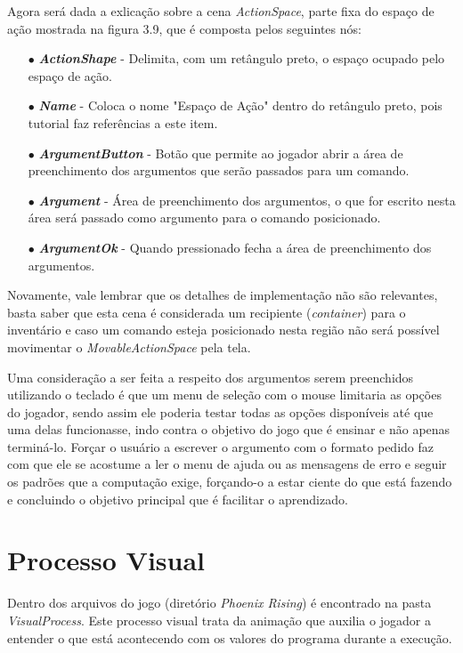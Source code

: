 Agora será dada a exlicação sobre a cena \textit{ActionSpace}, parte fixa do 
espaço de ação mostrada na figura 3.9, que é composta pelos seguintes nós:

\begin{itemize}
    \item[$\bullet$]
        \textbf{\textit{ActionShape}} - Delimita, com um retângulo preto, o
        espaço ocupado pelo espaço de ação.  
    \item[$\bullet$]
        \textbf{\textit{Name}} - Coloca o nome "Espaço de Ação" dentro do 
        retângulo preto, pois tutorial faz referências a este item. 
    \item[$\bullet$]
        \textbf{\textit{ArgumentButton}} - Botão que permite ao jogador 
        abrir a área de preenchimento dos argumentos que serão passados para um 
        comando.
    \item[$\bullet$]
        \textbf{\textit{Argument}} - Área de preenchimento dos argumentos, 
        o que for escrito nesta área será passado como argumento para o comando
        posicionado.  
    \item[$\bullet$]
        \textbf{\textit{ArgumentOk}} - Quando pressionado fecha a área de 
        preenchimento dos argumentos.
\end{itemize}

Novamente, vale lembrar que os detalhes de implementação não são relevantes, 
basta saber que esta cena é considerada um recipiente (\textit{container}) para 
o inventário e caso um comando esteja posicionado nesta região não será possível
movimentar o \textit{MovableActionSpace} pela tela.

Uma consideração a ser feita a respeito dos argumentos serem preenchidos 
utilizando o teclado é que um menu de seleção com o mouse limitaria as opções
do jogador, sendo assim ele poderia testar todas as opções disponíveis até que 
uma delas funcionasse, indo contra o objetivo do jogo que é ensinar e não apenas 
terminá-lo. Forçar o usuário a escrever o argumento com o formato pedido faz com
que ele se acostume a ler o menu de ajuda ou as mensagens de erro e seguir os 
padrões que a computação exige, forçando-o a estar ciente do que está fazendo e
concluindo o objetivo principal que é facilitar o aprendizado.

\section{Processo Visual}

Dentro dos arquivos do jogo (diretório \textit{Phoenix Rising}) é encontrado na
pasta \textit{VisualProcess}. Este processo visual trata da animação que auxilia
o jogador a entender o que está acontecendo com os valores do programa durante
a execução.

